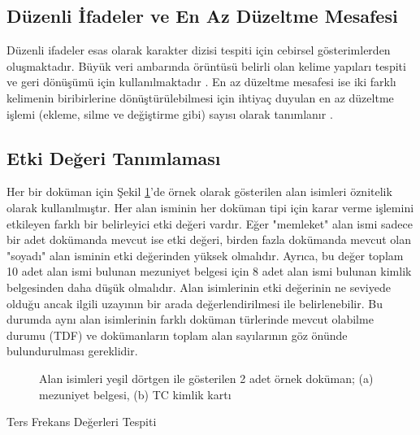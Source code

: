 \documentclass[conference, a4paper]{IEEEtran}
\begin{document}
\subsection{Düzenli İfadeler ve En Az Düzeltme Mesafesi}
Düzenli ifadeler esas olarak karakter dizisi tespiti için cebirsel gösterimlerden oluşmaktadır. Büyük veri ambarında
örüntüsü belirli olan kelime yapıları tespiti ve geri dönüşümü için kullanılmaktadır \cite{jurafsky2000speech}. En az
düzeltme mesafesi ise iki farklı kelimenin biribirlerine dönüştürülebilmesi için ihtiyaç duyulan en az düzeltme işlemi
(ekleme, silme ve değiştirme gibi) sayısı olarak tanımlanır \cite{levenshtein1966binary}.

\subsection{Etki Değeri Tanımlaması}
Her bir doküman için Şekil \ref{fig:alanisimleri}'de örnek olarak gösterilen alan isimleri öznitelik olarak
kullanılmıştır. Her alan isminin her doküman tipi için karar verme işlemini etkileyen farklı bir belirleyici etki
değeri vardır. Eğer "memleket" alan ismi sadece bir adet dokümanda mevcut ise etki değeri, birden fazla dokümanda
mevcut olan "soyadı" alan isminin etki değerinden yüksek olmalıdır. Ayrıca, bu değer toplam 10 adet alan ismi bulunan
mezuniyet belgesi için 8 adet alan ismi bulunan kimlik belgesinden daha düşük olmalıdır. Alan isimlerinin etki
değerinin ne seviyede olduğu ancak ilgili uzayının bir arada değerlendirilmesi ile belirlenebilir. Bu durumda aynı alan
isimlerinin farklı doküman türlerinde mevcut olabilme durumu (TDF) ve dokümanların toplam alan sayılarının göz önünde
bulundurulması gereklidir.

\begin{figure}
    \centering
    \shorthandoff{=}
    \par\medskip
    \caption{Alan isimleri yeşil dörtgen ile gösterilen 2  adet örnek doküman; (a) mezuniyet belgesi, (b) TC kimlik
        kartı}
    \label{fig:alanisimleri}
\end{figure}

\begin{algorithm}
    \caption{Ters Frekans Değerleri Tespiti}
    \label{alg:tersfrekans}
    \SetAlgoLined
\end{algorithm}
\end{document}
